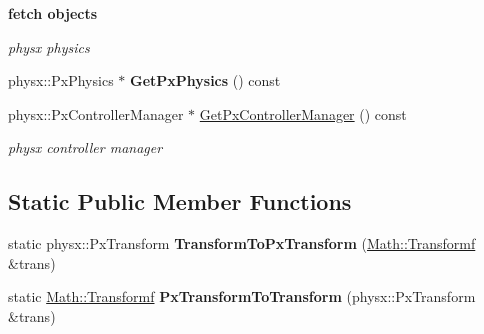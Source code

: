 \begin{Indent}{\bf fetch objects}\par
{\em \label{_amgrpb712734d7b6a37d417e36727149b52a3}
 physx physics }\begin{DoxyCompactItemize}
\item 
\hypertarget{classContent_1_1Physics_1_1PhysicsPhysX_a341b1597fbc8dc8a2595a6ab67833e6b}{
physx::PxPhysics $\ast$ {\bfseries GetPxPhysics} () const }
\label{classContent_1_1Physics_1_1PhysicsPhysX_a341b1597fbc8dc8a2595a6ab67833e6b}

\item 
\hypertarget{classContent_1_1Physics_1_1PhysicsPhysX_a17139c85cd8d4a2ef2207001ed3524e2}{
physx::PxControllerManager $\ast$ \hyperlink{classContent_1_1Physics_1_1PhysicsPhysX_a17139c85cd8d4a2ef2207001ed3524e2}{GetPxControllerManager} () const }
\label{classContent_1_1Physics_1_1PhysicsPhysX_a17139c85cd8d4a2ef2207001ed3524e2}

\begin{DoxyCompactList}\small\item\em physx controller manager \item\end{DoxyCompactList}\end{DoxyCompactItemize}
\end{Indent}
\subsection*{Static Public Member Functions}
\begin{DoxyCompactItemize}
\item 
\hypertarget{classContent_1_1Physics_1_1PhysicsPhysX_ab4e87c380044bf17970190c18eb644ff}{
static physx::PxTransform {\bfseries TransformToPxTransform} (\hyperlink{classMath_1_1Transform}{Math::Transformf} \&trans)}
\label{classContent_1_1Physics_1_1PhysicsPhysX_ab4e87c380044bf17970190c18eb644ff}

\item 
\hypertarget{classContent_1_1Physics_1_1PhysicsPhysX_aceb00da8454e9dbb6d68b0eac44b1c5e}{
static \hyperlink{classMath_1_1Transform}{Math::Transformf} {\bfseries PxTransformToTransform} (physx::PxTransform \&trans)}
\label{classContent_1_1Physics_1_1PhysicsPhysX_aceb00da8454e9dbb6d68b0eac44b1c5e}

\end{DoxyCompactItemize}
